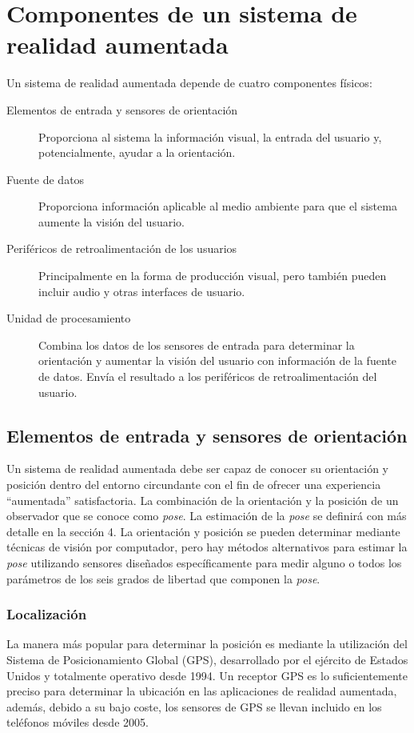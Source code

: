 \section{Componentes de un sistema de realidad aumentada}
Un sistema de realidad aumentada depende de cuatro componentes físicos:

\begin{description}
  
\item[Elementos de entrada y sensores de orientación] Proporciona al sistema la información visual, la entrada del usuario y, potencialmente, ayudar a la orientación.
  
\item[Fuente de datos] Proporciona información aplicable al medio ambiente para que el sistema aumente la visión del usuario.
  
\item[Periféricos de retroalimentación de los usuarios] Principalmente en la forma de producción visual, pero también pueden incluir audio y otras interfaces de usuario.
  
\item[Unidad de procesamiento] Combina los datos de los sensores de entrada para determinar la orientación y aumentar la visión del usuario con información de la fuente de datos. Envía el resultado a los periféricos de retroalimentación del usuario.
\end{description}

\subsection{Elementos de entrada y sensores de orientación}
Un sistema de realidad aumentada debe ser capaz de conocer su orientación y posición dentro del entorno circundante con el fin de ofrecer una experiencia ``aumentada'' satisfactoria. La combinación de la orientación y la posición de un observador que se conoce como \emph{pose}. La estimación de la \emph{pose} se definirá con más detalle en la sección 4. La orientación y posición se pueden determinar mediante técnicas de visión por computador, pero hay métodos alternativos para estimar la \emph{pose}  utilizando  sensores diseñados específicamente para medir alguno o todos los parámetros de los seis grados de libertad que componen la \emph{pose}.

\subsubsection{Localización}
La manera más popular para determinar la posición es mediante la utilización del Sistema de Posicionamiento Global (GPS), desarrollado por el ejército de Estados Unidos y totalmente operativo desde 1994. 
Un receptor GPS es lo suficientemente preciso para determinar la ubicación en las aplicaciones de realidad aumentada, además, debido a su bajo coste, los sensores de GPS se llevan incluido en los teléfonos móviles desde 2005.

